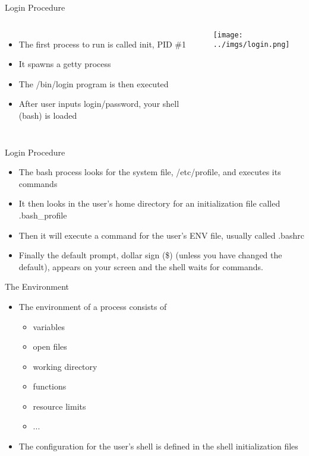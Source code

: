 \documentclass{beamer}
\begin{document}
\begin{frame}{Login Procedure}
\begin{columns}
\begin{itemize}
\item The first process to run is called init, PID \#1 
\item It spawns a getty process
\item The /bin/login program is then executed 
\item After user inputs login/password, your shell (bash) is loaded
\end{itemize}
\texttt{[image: ../imgs/login.png]}
\end{columns}
\end{frame}

\begin{frame}{Login Procedure}
\begin{itemize}
\item The bash process looks for the system file, /etc/profile, and executes its commands 
\item It then looks in the user's home directory for an initialization file called .bash\_profile
\item Then it will execute a command for the user's ENV file, usually called .bashrc
\item Finally the default prompt, dollar sign (\$) (unless you have changed the default), appears on your screen and the shell waits for commands.   
\end{itemize}
\end{frame}

\begin{frame}{The Environment}
\begin{itemize}
\item The environment of a process consists of 
\begin{itemize}
\item variables
\item open files
\item working directory
\item functions
\item resource limits
\item ... 
\end{itemize}
\item The configuration for the user's shell is defined in the shell initialization files 
\end{itemize}
\end{frame}
\end{document}
